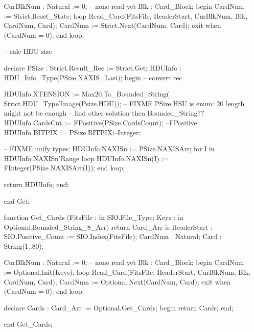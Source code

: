                 CurBlkNum : Natural := 0; -- none read yet
                Blk : Card_Block;
   begin
                CardNum := Strict.Reset_State;
                loop
                        Read_Card(FitsFile, HeaderStart, CurBlkNum, Blk, CardNum, Card);
                        CardNum := Strict.Next(CardNum, Card);
                        exit when (CardNum = 0); 
                end loop;

                -- calc HDU size

                declare
                        PSize   : Strict.Result_Rec := Strict.Get;
                        HDUInfo : HDU_Info_Type(PSize.NAXIS_Last);
                begin
                        -- convert rec
    
                        HDUInfo.XTENSION := Max20.To_Bounded_String(
					Strict.HDU_Type'Image(Psize.HDU));
					-- FIXME PSize.HSU is enum: 20 length might not be enough
					-- find other solution then Bounded_String??
                        HDUInfo.CardsCnt := FPositive(PSize.CardsCount); --FPositive
                        HDUInfo.BITPIX   := PSize.BITPIX;--Integer; 

			-- FIXME unify types:   HDUInfo.NAXISn := PSize.NAXISArr;
                        for I in HDUInfo.NAXISn'Range
                        loop
                                HDUInfo.NAXISn(I) := FInteger(PSize.NAXISArr(I));
                        end loop;

                        return HDUInfo;
                end;

   end Get;




   function  Get_Cards (FitsFile : in  SIO.File_Type;
                       Keys : in Optional.Bounded_String_8_Arr)
      return Card_Arr
   is
 	HeaderStart : SIO.Positive_Count := SIO.Index(FitsFile);	
     	CardNum : Natural;
        Card : String(1..80);

	CurBlkNum : Natural := 0; -- none read yet
	Blk : Card_Block;
   begin
        CardNum := Optional.Init(Keys);
        loop
		Read_Card(FitsFile, HeaderStart, CurBlkNum, Blk, CardNum, Card);
                CardNum := Optional.Next(CardNum, Card);
                exit when (CardNum = 0); 
        end loop;


	declare
		Cards : Card_Arr := Optional.Get_Cards;
	begin
		return Cards;
	end;

   end Get_Cards;





